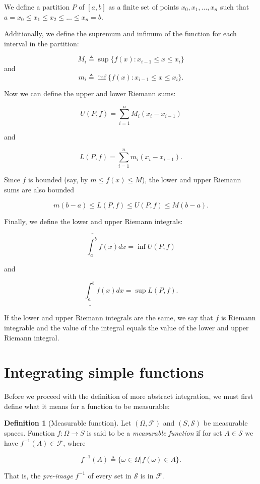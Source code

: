 \documentclass{book}
\theoremstyle{plain}%
\theoremstyle{definition}
\newtheorem{definition}{Definition}[section]
\newlength{\arrow}
\begin{document}
We define a partition $P$ of $[a,b]$ as a finite set of points $x_0, x_1,...,x_n$ such that $a = x_0 \leq x_1 \leq x_2 \leq ... \leq x_n = b$.

Additionally, we define the supremum and infimum of the function for each interval in the partition:

$$M_i \triangleq \sup\{f(x): x_{i-1} \leq x \leq x_i \}$$ and $$m_i \triangleq \inf\{f(x): x_{i-1} \leq x \leq x_i \}.$$

Now we can define the upper and lower Riemann sums:

$$U(P, f) = \sum_{i=1}^n M_i (x_i - x_{i-1})$$

and

$$L(P, f) = \sum_{i=1}^n m_i (x_i - x_{i-1}).$$

Since $f$ is bounded (say, by $m \leq f(x) \leq M$), the lower and upper Riemann sums are also bounded

$$m(b-a) \leq L(P, f) \leq U(P, f) \leq M(b-a).$$

Finally, we define the lower and upper Riemann integrals:

$$\overline{\int_a^b} f(x)dx =  \inf U(P,f)$$

and

$$\underline{\int_a^b} f(x)dx =  \sup L(P,f).$$


If the lower and upper Riemann integrals are the same, we say that $f$ is Riemann integrable and the value of the integral equals the value of the lower and upper Riemann integral.

\section{Integrating simple functions}

Before we proceed with the definition of more abstract integration, we must first define what it means for a function to be measurable:

\begin{definition}[Measurable function]
Let $(\Omega, \mathcal{F})$ and $(S, \mathcal{S})$ be measurable spaces. Function $f: \Omega \rightarrow S$ is said to be a \emph{measurable function} if for set $A \in \mathcal{S}$ we have $f^{-1}(A) \in \mathcal{F}$, where

$$f^{-1}(A) \triangleq \{\omega \in \Omega | f(\omega) \in A\}.$$

That is, the \emph{pre-image} $f^{-1}$ of every set in $\mathcal{S}$ is in $\mathcal{F}$.\label{def:measurable}
\end{definition}
\end{document}
